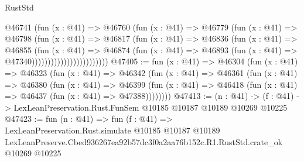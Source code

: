 \begin{lexlean}{RustStd}
\begin{coremodule}
                                @46741
                                  (fun (x : @41) =>
                                  @46760
                                    (fun (x : @41) =>
                                    @46779
                                      (fun (x : @41) =>
                                      @46798
                                        (fun (x : @41) =>
                                        @46817
                                          (fun (x : @41) =>
                                          @46836
                                            (fun (x : @41) =>
                                            @46855
                                              (fun (x : @41) =>
                                              @46874
                                                (fun (x : @41) =>
                                                @46893
                                                  (fun (x : @41) => @47340))))))))))))))))))))))))
@47405 := fun (x : @41) =>
  @46304
    (fun (x : @41) =>
    @46323
      (fun (x : @41) =>
      @46342
        (fun (x : @41) =>
        @46361
          (fun (x : @41) =>
          @46380
            (fun (x : @41) =>
            @46399
              (fun (x : @41) => @46418 (fun (x : @41) => @46437 (fun (x : @41) => @47388))))))))
@47413 := (n : @41) ->
  (f : @41) -> LexLeanPreservation.Rust.FunSem @10185 @10187 @10189 @10269 @10225
@47423 := fun (n : @41) =>
  fun (f : @41) =>
  LexLeanPreservation.Rust.simulate
    @10185
    @10187
    @10189
    LexLeanPreserve.Cbed936267ea92b57dc3f0a2aa76b152c.R1.RustStd.crate_ok
    @10269
    @10225
\end{coremodule}
\end{lexlean}

